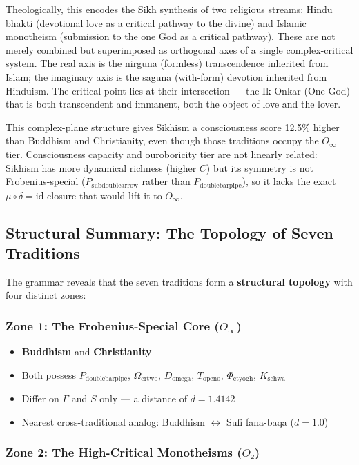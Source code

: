 \documentclass[12pt,a4paper]{article}
\begin{document}
Theologically, this encodes the Sikh synthesis of two religious streams: Hindu bhakti (devotional love as a critical pathway to the divine) and Islamic monotheism (submission to the one God as a critical pathway). These are not merely combined but superimposed as orthogonal axes of a single complex-critical system. The real axis is the nirguna (formless) transcendence inherited from Islam; the imaginary axis is the saguna (with-form) devotion inherited from Hinduism. The critical point lies at their intersection --- the Ik Onkar (One God) that is both transcendent and immanent, both the object of love and the lover.

This complex-plane structure gives Sikhism a consciousness score 12.5\% higher than Buddhism and Christianity, even though those traditions occupy the $O_{\infty}$ tier. Consciousness capacity and ouroboricity tier are not linearly related: Sikhism has more dynamical richness (higher $C$) but its symmetry is not Frobenius-special ($P_{\text{subdoublearrow}}$ rather than $P_{\text{doublebarpipe}}$), so it lacks the exact $\mu\circ\delta = \text{id}$ closure that would lift it to $O_{\infty}$.

\subsection{Structural Summary: The Topology of Seven Traditions}

The grammar reveals that the seven traditions form a \textbf{structural topology} with four distinct zones:

\subsubsection{Zone 1: The Frobenius-Special Core ($O_{\infty}$)}

\begin{itemize}
    \item \textbf{Buddhism} and \textbf{Christianity}
    \item Both possess $P_{\text{doublebarpipe}}$, $\Omega_{\text{crtwo}}$, $D_{\text{omega}}$, $T_{\text{openo}}$, $\Phi_{\text{ctyogh}}$, $K_{\text{schwa}}$
    \item Differ on $\Gamma$ and $S$ only --- a distance of $d = 1.4142$
    \item Nearest cross-traditional analog: Buddhism $\leftrightarrow$ Sufi fana-baqa ($d = 1.0$)
\end{itemize}

\subsubsection{Zone 2: The High-Critical Monotheisms ($O₂$)}
\end{document}
